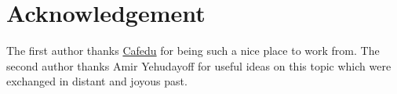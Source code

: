 \documentclass[11pt]{article}
\begin{document}
\section*{Acknowledgement}
The first author thanks \href{https://www.cafedu.cz/en/}{Cafedu} for being such a nice place to work from.
The second author thanks Amir Yehudayoff for useful ideas on this topic which were exchanged in distant and joyous past. 




\end{document}
